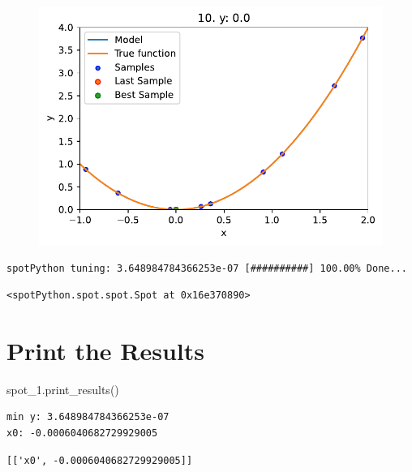 \documentclass[
  letterpaper,
  DIV=11,
  numbers=noendperiod]{scrreprt}
\newenvironment{Shaded}{\begin{snugshade}}{\end{snugshade}}
\newcommand{\NormalTok}[1]{\textcolor[rgb]{0.00,0.23,0.31}{#1}}
\begin{document}
\begin{figure}[H]

{\centering \includegraphics{007_num_spot_intro_files/figure-pdf/cell-10-output-2.pdf}

}

\end{figure}

\begin{verbatim}
spotPython tuning: 3.648984784366253e-07 [##########] 100.00% Done...
\end{verbatim}

\begin{verbatim}
<spotPython.spot.spot.Spot at 0x16e370890>
\end{verbatim}

\hypertarget{print-the-results-1}{%
\section{Print the Results}\label{print-the-results-1}}

\begin{Shaded}
\begin{Highlighting}[]
\NormalTok{spot\_1.print\_results()}
\end{Highlighting}
\end{Shaded}

\begin{verbatim}
min y: 3.648984784366253e-07
x0: -0.0006040682729929005
\end{verbatim}

\begin{verbatim}
[['x0', -0.0006040682729929005]]
\end{verbatim}
\end{document}

